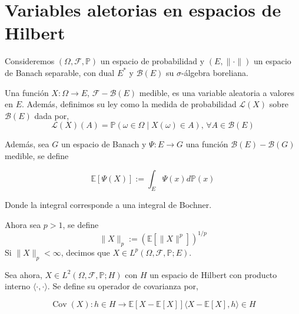 \section{Variables aletorias en espacios de Hilbert}

Consideremos $(\Omega, \mathcal{F}, \mathbb{P})$ un espacio de probabilidad y $(E, \|\cdot \|)$ un espacio de Banach separable, con dual $E^*$ y $\mathcal{B}(E)$ su $\sigma$-álgebra boreliana.

Una función $X: \Omega \rightarrow E$, $\mathcal{F}-\mathcal{B}(E)$ medible, es una variable aleatoria a valores en $E$. Además, definimos su ley como la medida de probabilidad $\mathcal{L}(X)$ sobre $\mathcal{B}(E)$ dada por,
$$
\mathcal{L}(X)(A) = \mathbb{P}(\omega \in \Omega \mid X(\omega) \in A),\, \forall A \in \mathcal{B}(E)
$$

Además, sea $G$ un espacio de Banach y $\Psi: E \rightarrow G$ una función $\mathcal{B}(E)-\mathcal{B}(G)$ medible, se define

$$
\mathbb{E}[\Psi(X)] := \int_E \Psi(x) d \mathbb{P}(x)
$$

Donde la integral corresponde a una integral de Bochner.

Ahora sea $p > 1$, se define
$$
\| X \|_p := (\mathbb{E}[\|X\|^p])^{1/p}
$$
Si $\|X\|_p < \infty$, decimos que $X \in L^p(\Omega, \mathcal{F}, \mathbb{P};  E)$.

Sea ahora, $X \in L^2(\Omega, \mathcal{F}, \mathbb{P}; H)$ con $H$ un espacio de Hilbert con producto interno $\langle \cdot, \cdot \rangle$. Se define su operador de covarianza por,

$$
\operatorname{Cov}(X): h \in H \rightarrow \mathbb{E}[X - \mathbb{E}[X]]\langle X - \mathbb{E}[X], h \rangle \in H
$$
